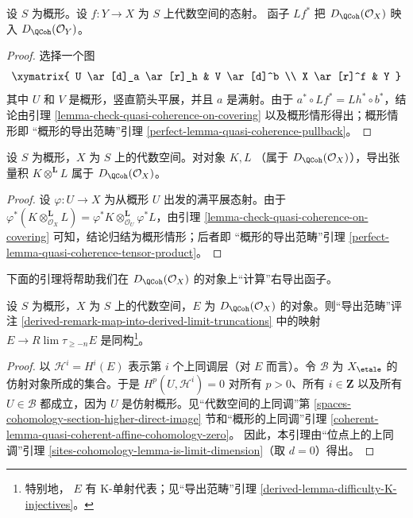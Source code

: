 \begin{lemma}
\label{lemma-quasi-coherence-pullback}
设 $S$ 为概形。设 $f : Y \to X$ 为 $S$ 上代数空间的态射。
函子 $Lf^*$ 把 $D_\QCoh(\mathcal{O}_X)$ 映入
$D_\QCoh(\mathcal{O}_Y)$。
\end{lemma}

\begin{proof}
选择一个图
$$
\xymatrix{
U \ar[d]_a \ar[r]_h & V \ar[d]^b \\
X \ar[r]^f & Y
}
$$
其中 $U$ 和 $V$ 是概形，竖直箭头平展，并且 $a$ 是满射。由于
$a^* \circ Lf^* = Lh^* \circ b^*$，结论由引理
\ref{lemma-check-quasi-coherence-on-covering} 以及概形情形得出；概形情形即
“概形的导出范畴”引理
\ref{perfect-lemma-quasi-coherence-pullback}。
\end{proof}

\begin{lemma}
\label{lemma-quasi-coherence-tensor-product}
设 $S$ 为概形，$X$ 为 $S$ 上的代数空间。对对象 $K, L$
（属于 $D_\QCoh(\mathcal{O}_X)$），导出张量积
$K \otimes^\mathbf{L} L$ 属于 $D_\QCoh(\mathcal{O}_X)$。
\end{lemma}

\begin{proof}
设 $\varphi : U \to X$ 为从概形 $U$ 出发的满平展态射。由于
$\varphi^*(K \otimes_{\mathcal{O}_X}^\mathbf{L} L) =
\varphi^*K \otimes_{\mathcal{O}_U}^\mathbf{L} \varphi^*L$，由引理
\ref{lemma-check-quasi-coherence-on-covering} 可知，结论归结为概形情形；后者即
“概形的导出范畴”引理
\ref{perfect-lemma-quasi-coherence-tensor-product}。
\end{proof}

\noindent
下面的引理将帮助我们在 $D_\QCoh(\mathcal{O}_X)$ 的对象上“计算”右导出函子。

\begin{lemma}
\label{lemma-nice-K-injective}
设 $S$ 为概形，$X$ 为 $S$ 上的代数空间，$E$ 为
$D_\QCoh(\mathcal{O}_X)$ 的对象。则“导出范畴”评注
\ref{derived-remark-map-into-derived-limit-truncations} 中的映射
$E \to R\lim \tau_{\geq -n}E$ 是同构\footnote{特别地，
$E$ 有 K-单射代表；见“导出范畴”引理
\ref{derived-lemma-difficulty-K-injectives}。}。
\end{lemma}

\begin{proof}
以 $\mathcal{H}^i = H^i(E)$ 表示第 $i$ 个上同调层（对 $E$ 而言）。令
$\mathcal{B}$ 为 $X_\etale$ 的仿射对象所成的集合。于是
$H^p(U, \mathcal{H}^i) = 0$ 对所有 $p > 0$、所有
$i \in \mathbf{Z}$ 以及所有 $U \in \mathcal{B}$ 都成立，因为
$U$ 是仿射概形。见“代数空间的上同调”第
\ref{spaces-cohomology-section-higher-direct-image} 节和“概形的上同调”引理
\ref{coherent-lemma-quasi-coherent-affine-cohomology-zero}。
因此，本引理由“位点上的上同调”引理
\ref{sites-cohomology-lemma-is-limit-dimension}（取 $d = 0$）得出。
\end{proof}

